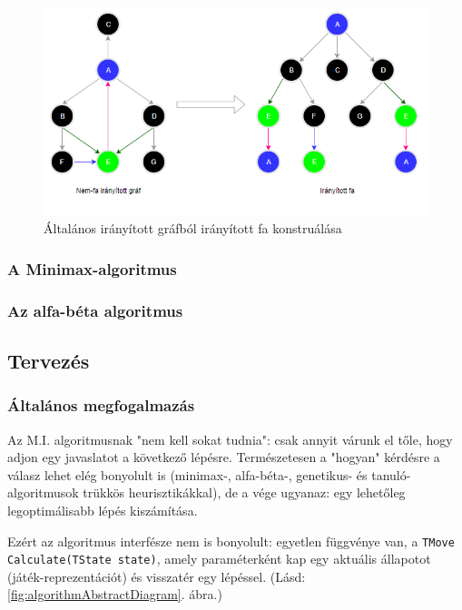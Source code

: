 \documentclass[twoside, a4paper, 12pt]{article}
\begin{document}
\begin{figure}[htbp]
	\centering
	\includegraphics[width=1.0\textwidth]{img/game-graph-transformation.png}
	\caption{Általános irányított gráfból irányított fa konstruálása}
	\label{fig:game-graph-transformation}
\end{figure}

\subsubsection{A Minimax-algoritmus}
\lipsum[1]

\subsubsection{Az alfa-béta algoritmus}
\lipsum[2]

\subsection{Tervezés}
\subsubsection{Általános megfogalmazás}
Az M.I. algoritmusnak "nem kell sokat tudnia": csak annyit várunk el tőle, hogy adjon egy javaslatot a következő lépésre. Természetesen a "hogyan" kérdésre a válasz lehet elég bonyolult is (minimax-, alfa-béta-, genetikus- és tanuló-algoritmusok trükkös heurisztikákkal), de a vége ugyanaz: egy lehetőleg legoptimálisabb lépés kiszámítása.

Ezért az algoritmus interfésze nem is bonyolult: egyetlen függvénye van, a \texttt{TMove Calculate(TState state)}, amely paraméterként kap egy aktuális állapotot (játék-reprezentációt) és visszatér egy lépéssel. (Lásd: \ref{fig:algorithmAbstractDiagram}. ábra.)
\end{document}
